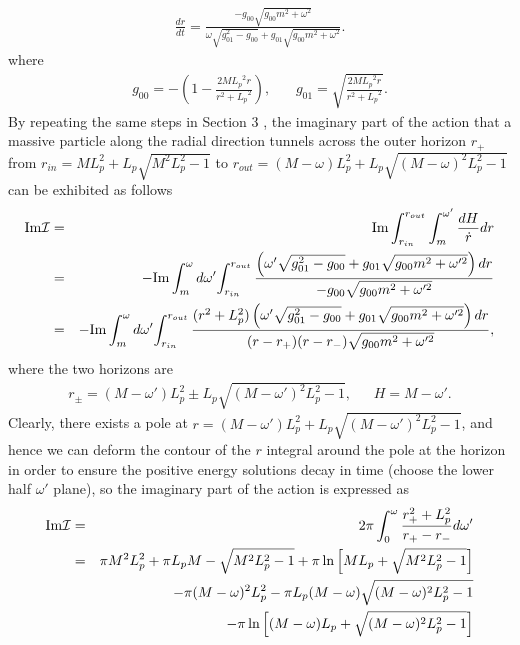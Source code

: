 \documentclass[12pt]{article}
\begin{document}
\begin{eqnarray}
\frac{dr}{dt} = \frac{- g_{00}  \sqrt{g_{00}m^2 +\omega^2} }{\omega\sqrt{g_{01}^2-g_{00}}+ g_{01}\sqrt{g_{00} m^2+\omega^2}}.
\end{eqnarray}
where
\begin{eqnarray}
g_{00}=- \left(1 - \frac{2 M {L_p}^2 r}{r^2+{L_p}^2} \right), \ \ \ \ \ \ \ \ g_{01}=\sqrt{\frac{2 M {L_p}^2 r}{r^2+{L_p}^2}}.
\end{eqnarray}
By repeating the same steps in Section 3 , the imaginary part of the action that a massive particle  along the radial direction tunnels across the outer horizon $r_+$ from $r_{in} = M L_p^2 + L_p \sqrt{ M^2 L_p^2 - 1}$ to $r_{out}=(M- \omega) L_p^2 + L_p \sqrt{(M-\omega)^2 L_p^2 - 1}$ can be exhibited as follows
\begin{eqnarray}
{\rm Im}{\cal I}  &=&  {\rm Im} \int_{r_{in}}^{r_{out}} \int_{m}^{\omega'} \frac{dH}{\dot{r}} dr               \nonumber\\
&=& -{\rm Im} \int_{m}^{\omega}d\omega' {\int_{r_{in}}^{r_{out}} \frac{\left(\omega'\sqrt{g_{01}^2-g_{00}}+ g_{01}\sqrt{g_{00} m^2+\omega'^2}\right)  dr}{- g_{00}  \sqrt{g_{00}m^2 +\omega'^2}}  }  \nonumber\\
&=& - {\rm Im} \int_{m}^{\omega}d\omega' {\int_{r_{in}}^{r_{out}} \frac{(r^2+L_p^2)\left(\omega'\sqrt{g_{01}^2-g_{00}}+ g_{01}\sqrt{g_{00} m^2+\omega'^2}\right)  dr}{(r - r_+)(r-r_-)  \sqrt{g_{00}m^2 +\omega'^2}}  },
\end{eqnarray}
where the two horizons are
\begin{eqnarray}
r_\pm = (M- \omega') L_p^2 \pm L_p \sqrt{(M-\omega')^2 L_p^2 - 1}, \ \ \ \ \ \ \  H= M-\omega'.
\end{eqnarray}
Clearly, there exists a pole at $ r= (M- \omega') L_p^2 + L_p \sqrt{(M-\omega')^2 L_p^2 - 1} $, and hence  we can deform the contour of the $r$ integral around the pole at the horizon in order to ensure the positive energy solutions decay in time (choose the lower half $\omega'$  plane), so the imaginary part of the action is expressed as
\begin{eqnarray}
{\rm Im}{\cal I}  &=&  2\pi \int_{0}^{\omega}  \frac{r_+^2 + L_p^2}{r_+ - r_-} d\omega'     \nonumber \\
& =&  \pi M^2 L_p^2 + \pi L_p M-\sqrt{ M^2 L_p^2-1}   + \pi \ln \left[M L_p +\sqrt{M^2 L_p^2-1}\right]                              \nonumber \\
&&- \pi (M-\omega)^2L_p^2 - \pi L_p(M-\omega)\sqrt{(M-\omega)^2 L_p^2-1}       \nonumber \\
&&- \pi \ln \left[(M-\omega)L_p +\sqrt{(M-\omega)^2 L_p^2-1}\right]
\end{eqnarray}
\end{document}
